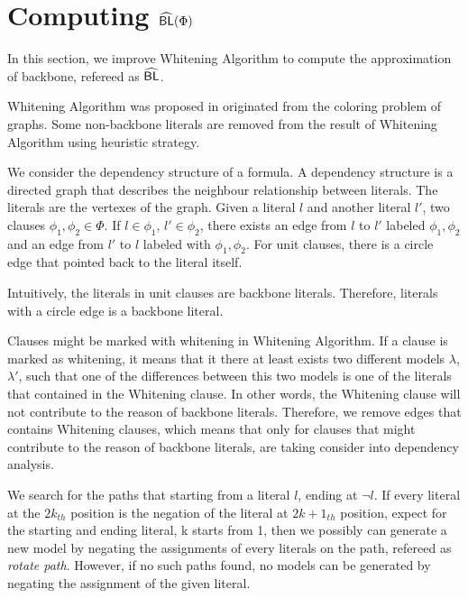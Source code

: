 

\section{Computing ${\sf \widehat{BL}}(\Phi)$}

 In this section, we improve Whitening Algorithm to compute the approximation of backbone, refereed as ${\sf \widehat{BL}}$.

 Whitening Algorithm was proposed in \cite{CJG2001} originated from the coloring problem of graphs. Some non-backbone literals are removed from the result of Whitening Algorithm using heuristic strategy.

 We consider the dependency structure of a formula. A dependency structure is a directed graph that describes the neighbour relationship between literals. The literals are the vertexes of the graph. Given a literal $l$ and another literal $l'$, two clauses $\phi_1,\phi_2\in\Phi$. If $l\in\phi_1$, $l'\in\phi_2$, there exists an edge from $l$ to $l'$ labeled $\phi_1,\phi_2$ and an edge from $l'$ to $l$ labeled with $\phi_1, \phi_2$. For unit clauses, there is a circle edge that pointed back to the literal itself.

 Intuitively, the literals in unit clauses are backbone literals. Therefore, literals with a circle edge is a backbone literal.

 Clauses might be marked with whitening in Whitening Algorithm. If a clause is marked as whitening, it means that it there at least exists two different models $\lambda$, $\lambda'$, such that one of the differences between this two models is one of the literals that contained in the Whitening clause. In other words, the Whitening clause will not contribute to the reason of backbone literals. Therefore, we remove edges that contains Whitening clauses, which means that only for clauses that might contribute to the reason of backbone literals, are taking consider into dependency analysis.

 We search for the paths that starting from a literal $l$, ending at $\neg l$. If every literal at the $2k_{th}$ position is the negation of the literal at $2k+1_{th}$ position, expect for the starting and ending literal, k starts from 1, then we possibly can generate a new model by negating the assignments of every literals on the path, refereed as \emph{rotate path}. However, if no such paths found, no models can be generated by negating the assignment of the given literal.

